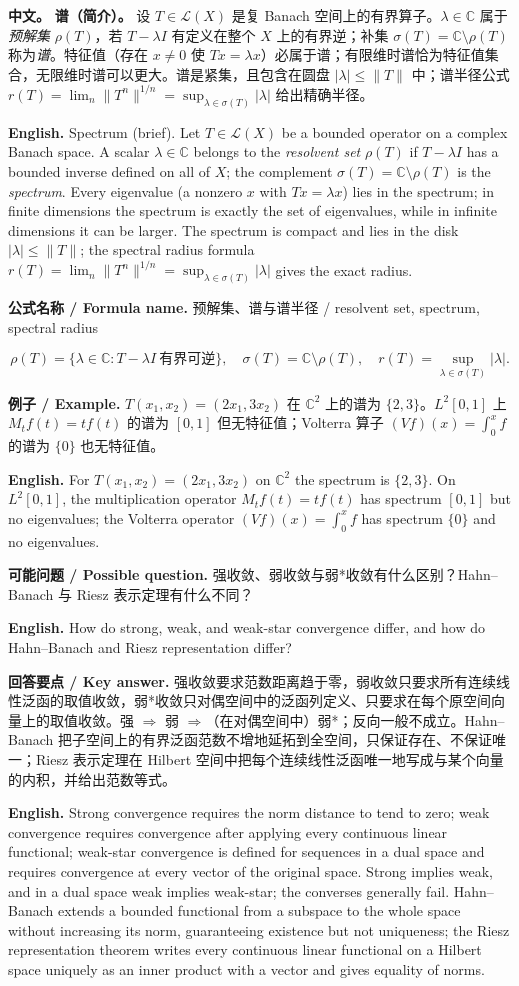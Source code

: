 \documentclass[UTF8,11pt,a4paper]{ctexart}
\newcommand{\EN}[1]{\par\noindent \textbf{English.} #1\par}
\newcommand{\FORMULA}[2]{\par\noindent\textbf{公式名称 / Formula name.} #1 / #2\par}
\newcommand{\EX}[2]{\par\noindent \textbf{例子 / Example.} #1\par\EN{#2}}
\newcommand{\ASK}[4]{\par\noindent \textbf{可能问题 / Possible question.} #1\par\EN{#2}\noindent \textbf{回答要点 / Key answer.} #3\par\EN{#4}\smallskip}
\newcommand{\APS}[2]{\par\noindent\textbf{中文。} #1\par\noindent\textbf{English.} #2\par\smallskip}
\begin{document}
\APS{\textbf{谱（简介）。} 设 $T\in\mathcal L(X)$ 是复 Banach 空间上的有界算子。$\lambda\in\mathbb C$ 属于\emph{预解集} $\rho(T)$，若 $T-\lambda I$ 有定义在整个 $X$ 上的有界逆；补集 $\sigma(T)=\mathbb C\setminus\rho(T)$ 称为\emph{谱}。特征值（存在 $x\ne0$ 使 $Tx=\lambda x$）必属于谱；有限维时谱恰为特征值集合，无限维时谱可以更大。谱是紧集，且包含在圆盘 $|\lambda|\le\|T\|$ 中；谱半径公式 $r(T)=\lim_n\|T^n\|^{1/n}=\sup_{\lambda\in\sigma(T)}|\lambda|$ 给出精确半径。}{Spectrum (brief). Let $T\in\mathcal L(X)$ be a bounded operator on a complex Banach space. A scalar $\lambda\in\mathbb C$ belongs to the \emph{resolvent set} $\rho(T)$ if $T-\lambda I$ has a bounded inverse defined on all of $X$; the complement $\sigma(T)=\mathbb C\setminus\rho(T)$ is the \emph{spectrum}. Every eigenvalue (a nonzero $x$ with $Tx=\lambda x$) lies in the spectrum; in finite dimensions the spectrum is exactly the set of eigenvalues, while in infinite dimensions it can be larger. The spectrum is compact and lies in the disk $|\lambda|\le\|T\|$; the spectral radius formula $r(T)=\lim_n\|T^n\|^{1/n}=\sup_{\lambda\in\sigma(T)}|\lambda|$ gives the exact radius.}
\FORMULA{预解集、谱与谱半径}{resolvent set, spectrum, spectral radius}
\[
\rho(T)=\{\lambda\in\mathbb C:T-\lambda I\ \text{有界可逆}\},
\quad
\sigma(T)=\mathbb C\setminus\rho(T),
\quad
r(T)=\sup_{\lambda\in\sigma(T)}|\lambda|.
\]

\EX{$T(x_1,x_2)=(2x_1,3x_2)$ 在 $\mathbb C^2$ 上的谱为 $\{2,3\}$。$L^2[0,1]$ 上 $M_tf(t)=tf(t)$ 的谱为 $[0,1]$ 但无特征值；Volterra 算子 $(Vf)(x)=\int_0^xf$ 的谱为 $\{0\}$ 也无特征值。}{For $T(x_1,x_2)=(2x_1,3x_2)$ on $\mathbb C^2$ the spectrum is $\{2,3\}$. On $L^2[0,1]$, the multiplication operator $M_tf(t)=tf(t)$ has spectrum $[0,1]$ but no eigenvalues; the Volterra operator $(Vf)(x)=\int_0^xf$ has spectrum $\{0\}$ and no eigenvalues.}
\ASK{强收敛、弱收敛与弱*收敛有什么区别？Hahn--Banach 与 Riesz 表示定理有什么不同？}{How do strong, weak, and weak-star convergence differ, and how do Hahn--Banach and Riesz representation differ?}{强收敛要求范数距离趋于零，弱收敛只要求所有连续线性泛函的取值收敛，弱*收敛只对偶空间中的泛函列定义、只要求在每个原空间向量上的取值收敛。强 $\Rightarrow$ 弱 $\Rightarrow$（在对偶空间中）弱*；反向一般不成立。Hahn--Banach 把子空间上的有界泛函范数不增地延拓到全空间，只保证存在、不保证唯一；Riesz 表示定理在 Hilbert 空间中把每个连续线性泛函唯一地写成与某个向量的内积，并给出范数等式。}{Strong convergence requires the norm distance to tend to zero; weak convergence requires convergence after applying every continuous linear functional; weak-star convergence is defined for sequences in a dual space and requires convergence at every vector of the original space. Strong implies weak, and in a dual space weak implies weak-star; the converses generally fail. Hahn--Banach extends a bounded functional from a subspace to the whole space without increasing its norm, guaranteeing existence but not uniqueness; the Riesz representation theorem writes every continuous linear functional on a Hilbert space uniquely as an inner product with a vector and gives equality of norms.}
\end{document}
